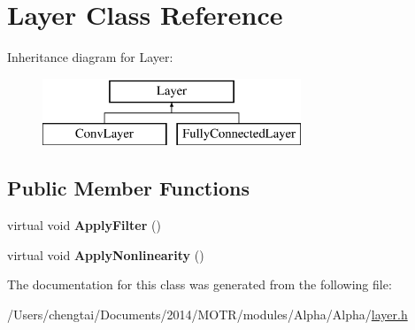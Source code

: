 \hypertarget{class_layer}{\section{Layer Class Reference}
\label{class_layer}
}
Inheritance diagram for Layer\+:\begin{figure}[H]
\begin{center}
\leavevmode
\includegraphics[height=2.000000cm]{class_layer}
\end{center}
\end{figure}
\subsection*{Public Member Functions}
\begin{DoxyCompactItemize}
\item 
\hypertarget{class_layer_acb52658f0eb1ec6f693dae392667d699}{virtual void {\bfseries Apply\+Filter} ()}\label{class_layer_acb52658f0eb1ec6f693dae392667d699}

\item 
\hypertarget{class_layer_aab2270f2a6793112a8fa5aefe33eed1e}{virtual void {\bfseries Apply\+Nonlinearity} ()}\label{class_layer_aab2270f2a6793112a8fa5aefe33eed1e}

\end{DoxyCompactItemize}


The documentation for this class was generated from the following file\+:\begin{DoxyCompactItemize}
\item 
/\+Users/chengtai/\+Documents/2014/\+M\+O\+T\+R/modules/\+Alpha/\+Alpha/\hyperlink{layer_8h}{layer.\+h}\end{DoxyCompactItemize}

